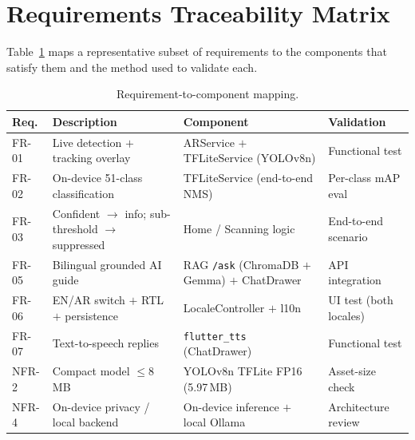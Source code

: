 \section{Requirements Traceability Matrix}

Table~\ref{tab:traceability} maps a representative subset of requirements to the
components that satisfy them and the method used to validate each.

\begin{table}[htbp]
\centering\small
\caption{Requirement-to-component mapping.}
\label{tab:traceability}
\begin{tabularx}{\textwidth}{@{}l>{\raggedright\arraybackslash}X>{\raggedright\arraybackslash}X>{\raggedright\arraybackslash}p{2.3cm}@{}}
\toprule
\textbf{Req.} & \textbf{Description} & \textbf{Component} & \textbf{Validation}\\
\midrule
FR-01 & Live detection $+$ tracking overlay & ARService $+$ TFLiteService (YOLOv8n) & Functional test\\
FR-02 & On-device 51-class classification & TFLiteService (end-to-end NMS) & Per-class mAP eval\\
FR-03 & Confident $\rightarrow$ info; sub-threshold $\rightarrow$ suppressed & Home / Scanning logic & End-to-end scenario\\
FR-05 & Bilingual grounded AI guide & RAG \texttt{/ask} (ChromaDB $+$ Gemma) $+$ ChatDrawer & API integration\\
FR-06 & EN/AR switch $+$ RTL $+$ persistence & LocaleController $+$ l10n & UI test (both locales)\\
FR-07 & Text-to-speech replies & \texttt{flutter\_tts} (ChatDrawer) & Functional test\\
NFR-2 & Compact model $\leq 8$\,MB & YOLOv8n TFLite FP16 (5.97\,MB) & Asset-size check\\
NFR-4 & On-device privacy / local backend & On-device inference $+$ local Ollama & Architecture review\\
\bottomrule
\end{tabularx}
\end{table}
